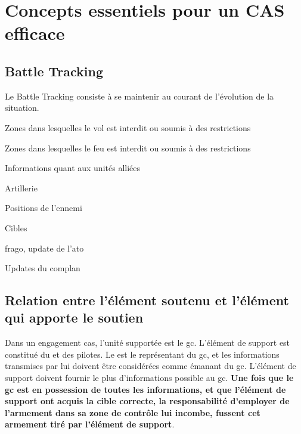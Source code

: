 \section{Concepts essentiels pour un CAS efficace}


\subsection{Battle Tracking}

Le Battle Tracking consiste à se maintenir au courant de l'évolution de la situation.

\begin{e1}
	\item Zones dans lesquelles le vol est interdit ou soumis à des restrictions
	\item Zones dans lesquelles le feu est interdit ou soumis à des restrictions
	\item Informations quant aux unités alliées
	\item Artillerie
	\item Positions de l'ennemi
	\item Cibles
	\item \gls{frago}, update de l'\gls{ato}
	\item Updates du \gls{complan}
\end{e1}

\subsection{Relation entre l'élément soutenu et l'élément qui apporte le soutien}


Dans un engagement \gls{cas}, l'unité supportée est le \gls{gc}. L'élément de support est constitué du \ja{} et des pilotes. Le \ja{} est le représentant du \gls{gc}, et les informations transmises par lui doivent être considérées comme émanant du \gls{gc}. L'élément de support doivent fournir le plus d'informations possible au \gls{gc}. \textbf{Une fois que le \gls{gc} est en possession de toutes les informations, et que l'élément de support ont acquis la cible correcte, la responsabilité d'employer de l'armement dans sa zone de contrôle lui incombe, fussent cet armement tiré par l'élément de support}.

